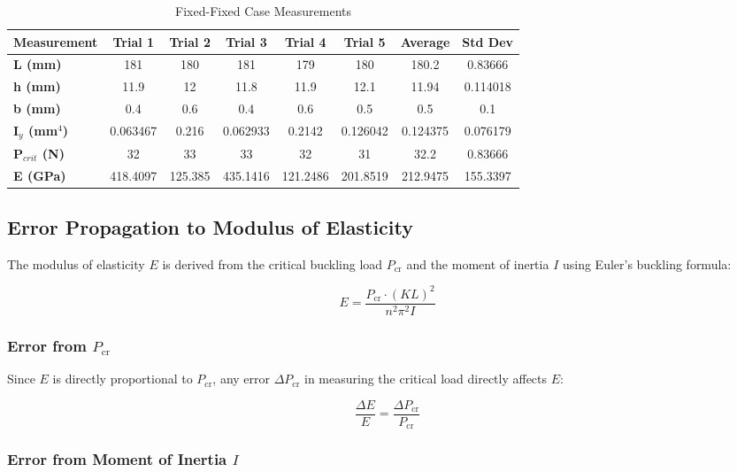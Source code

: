 \documentclass[12pt]{article}
\begin{document}
\begin{table}[h!]
\centering
\caption{Fixed-Fixed Case Measurements}
\begin{tabular}{@{}lccccccc@{}}
\toprule
\textbf{Measurement} & \textbf{Trial 1} & \textbf{Trial 2} & \textbf{Trial 3} & \textbf{Trial 4} & \textbf{Trial 5} & \textbf{Average} & \textbf{Std Dev} \\ \midrule
\textbf{L (mm)} & 181 & 180 & 181 & 179 & 180 & 180.2 & 0.83666 \\
\textbf{h (mm)} & 11.9 & 12 & 11.8 & 11.9 & 12.1 & 11.94 & 0.114018 \\
\textbf{b (mm)} & 0.4 & 0.6 & 0.4 & 0.6 & 0.5 & 0.5 & 0.1 \\
\textbf{I\(_y\) (mm\(^4\))} & 0.063467 & 0.216 & 0.062933 & 0.2142 & 0.126042 & 0.124375 & 0.076179 \\
\textbf{P\(_{crit}\) (N)} & 32 & 33 & 33 & 32 & 31 & 32.2 & 0.83666 \\
\textbf{E (GPa)} & 418.4097 & 125.385 & 435.1416 & 121.2486 & 201.8519 & 212.9475 & 155.3397 \\
\bottomrule
\end{tabular}
\label{tab:fixed_fixed}
\end{table}

\newpage
\subsection{Error Propagation to Modulus of Elasticity}
\label{subsec:error_propagation}

The modulus of elasticity \( E \) is derived from the critical buckling load \( P_{\text{cr}} \) and the moment of inertia \( I \) using Euler’s buckling formula:

\[
E = \frac{P_{\text{cr}} \cdot (K L)^2}{n^2 \pi^2 I}
\]

\subsubsection{Error from \( P_{\text{cr}} \)}
\label{subsubsec:error_Pcrit}

Since \( E \) is directly proportional to \( P_{\text{cr}} \), any error \( \Delta P_{\text{cr}} \) in measuring the critical load directly affects \( E \):

\[
\frac{\Delta E}{E} = \frac{\Delta P_{\text{cr}}}{P_{\text{cr}}}
\]

\subsubsection{Error from Moment of Inertia \( I \)}
\label{subsubsec:error_I}
\end{document}
